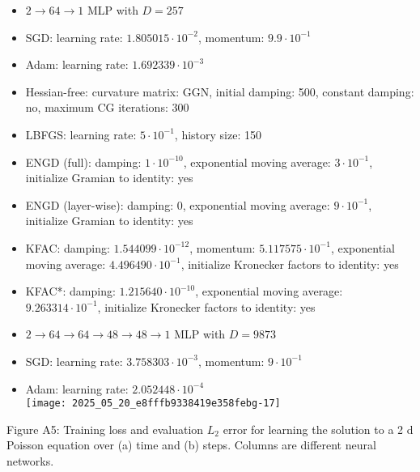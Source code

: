 \documentclass[10pt]{article}
\begin{document}
\begin{itemize}
  \item $2 \rightarrow 64 \rightarrow 1$ MLP with $D=257$
  \item SGD: learning rate: $1.805015 \cdot 10^{-2}$, momentum: $9.9 \cdot 10^{-1}$
  \item Adam: learning rate: $1.692339 \cdot 10^{-3}$
  \item Hessian-free: curvature matrix: GGN, initial damping: 500, constant damping: no, maximum CG iterations: 300
  \item LBFGS: learning rate: $5 \cdot 10^{-1}$, history size: 150
  \item ENGD (full): damping: $1 \cdot 10^{-10}$, exponential moving average: $3 \cdot 10^{-1}$, initialize Gramian to identity: yes
  \item ENGD (layer-wise): damping: 0, exponential moving average: $9 \cdot 10^{-1}$, initialize Gramian to identity: yes
  \item KFAC: damping: $1.544099 \cdot 10^{-12}$, momentum: $5.117575 \cdot 10^{-1}$, exponential moving average: $4.496490 \cdot 10^{-1}$, initialize Kronecker factors to identity: yes
  \item KFAC*: damping: $1.215640 \cdot 10^{-10}$, exponential moving average: $9.263314 \cdot 10^{-1}$, initialize Kronecker factors to identity: yes
  \item $2 \rightarrow 64 \rightarrow 64 \rightarrow 48 \rightarrow 48 \rightarrow 1$ MLP with $D=9873$
  \item SGD: learning rate: $3.758303 \cdot 10^{-3}$, momentum: $9 \cdot 10^{-1}$
  \item Adam: learning rate: $2.052448 \cdot 10^{-4}$\\
\texttt{[image: 2025\_05\_20\_e8fffb9338419e358febg-17]}
\end{itemize}

Figure A5: Training loss and evaluation $L_{2}$ error for learning the solution to a 2 d Poisson equation over (a) time and (b) steps. Columns are different neural networks.
\end{document}
